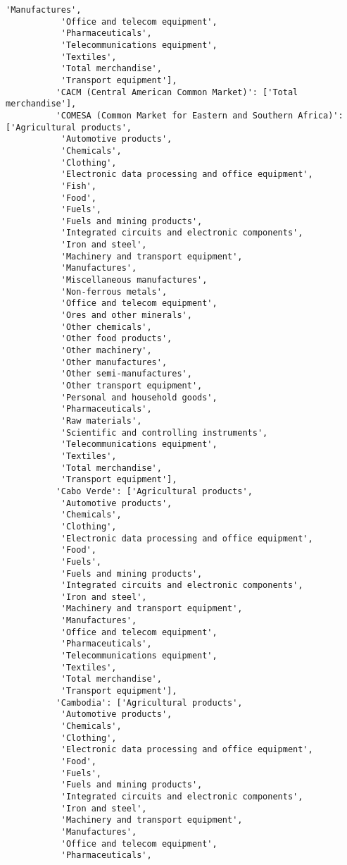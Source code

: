\documentclass[11pt]{article}
\begin{document}
\begin{Verbatim}[commandchars=\\\{\}]
           'Manufactures',
           'Office and telecom equipment',
           'Pharmaceuticals',
           'Telecommunications equipment',
           'Textiles',
           'Total merchandise',
           'Transport equipment'],
          'CACM (Central American Common Market)': ['Total merchandise'],
          'COMESA (Common Market for Eastern and Southern Africa)': ['Agricultural products',
           'Automotive products',
           'Chemicals',
           'Clothing',
           'Electronic data processing and office equipment',
           'Fish',
           'Food',
           'Fuels',
           'Fuels and mining products',
           'Integrated circuits and electronic components',
           'Iron and steel',
           'Machinery and transport equipment',
           'Manufactures',
           'Miscellaneous manufactures',
           'Non-ferrous metals',
           'Office and telecom equipment',
           'Ores and other minerals',
           'Other chemicals',
           'Other food products',
           'Other machinery',
           'Other manufactures',
           'Other semi-manufactures',
           'Other transport equipment',
           'Personal and household goods',
           'Pharmaceuticals',
           'Raw materials',
           'Scientific and controlling instruments',
           'Telecommunications equipment',
           'Textiles',
           'Total merchandise',
           'Transport equipment'],
          'Cabo Verde': ['Agricultural products',
           'Automotive products',
           'Chemicals',
           'Clothing',
           'Electronic data processing and office equipment',
           'Food',
           'Fuels',
           'Fuels and mining products',
           'Integrated circuits and electronic components',
           'Iron and steel',
           'Machinery and transport equipment',
           'Manufactures',
           'Office and telecom equipment',
           'Pharmaceuticals',
           'Telecommunications equipment',
           'Textiles',
           'Total merchandise',
           'Transport equipment'],
          'Cambodia': ['Agricultural products',
           'Automotive products',
           'Chemicals',
           'Clothing',
           'Electronic data processing and office equipment',
           'Food',
           'Fuels',
           'Fuels and mining products',
           'Integrated circuits and electronic components',
           'Iron and steel',
           'Machinery and transport equipment',
           'Manufactures',
           'Office and telecom equipment',
           'Pharmaceuticals',

\end{Verbatim}
\end{document}
